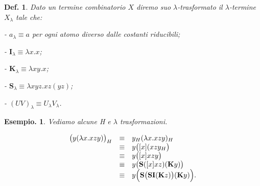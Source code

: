 \documentclass{book}
\newtheorem{definizione}{Def.}[chapter]
\newtheorem{esempio}{Esempio.}
\newcommand*{\ii}{\mathbf{I}}    %
\newcommand*{\kk}{\mathbf{K}}    %
\newcommand*{\sss}{\mathbf{S}}   %
\newcommand*{\lbt}{$\lambda$-ter\-mi\-ne}
\begin{document}
\begin{definizione}
Dato un termine combinatorio $X$ diremo suo $\lambda$-tras\-for\-ma\-to il 
\lbt~$X_\lambda$ tale che:
\item[-]$a_\lambda \equiv a$ per ogni atomo diverso dalle costanti riducibili;
\item[-]$\ii_\lambda \equiv \lambda x.x$;
\item[-]$\kk_\lambda \equiv \lambda xy.x$;
\item[-]$\sss_\lambda \equiv \lambda xyz.xz(yz)$;
\item[-]$(UV)_\lambda \equiv U_\lambda V_\lambda$. 
\end{definizione}

\begin{esempio}Vediamo alcune H e $\lambda$ trasformazioni.

\[
\begin{array}{lcl}
\bigl(y(\lambda x.xzy)\bigr)_H
   & \equiv & y_H (\lambda x.xzy)_H \\
   & \equiv & y\bigl([x](xzy_H \bigr) \\
   & \equiv & y\bigl([x]xzy\bigr) \\
   & \equiv & y\bigl(\sss([x]xz)(\kk y)\bigr) \\
   & \equiv & y\Bigl(\sss \bigl( \sss \ii (\kk z)\bigr) (\kk y) \Bigr). \\
\end{array}
\]


\end{esempio}
\end{document}
